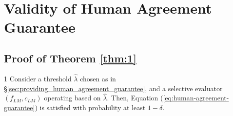 \newpage
\section{Validity of Human Agreement Guarantee}
\subsection{Proof of Theorem \ref{thm:1}} \label{app:proof_of_theorem1}
\begin{customthm}{1}
    Consider a threshold $\widehat{\lambda}$ chosen as in \S \ref{sec:providing_human_agreement_guarantee}, and a selective evaluator $(f_\textit{LM}, c_\textit{LM})$ operating based on $\widehat{\lambda}$. Then, Equation (\ref{eq:human-agreement-guarantee}) is satisfied with probability at least $1 - \delta$.
\end{customthm}

